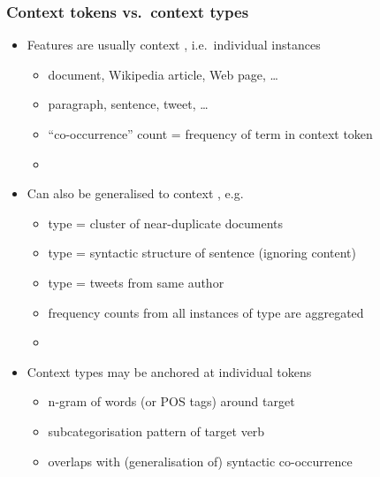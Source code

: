 \documentclass[t]{beamer} %
\begin{document}
\begin{frame}
  \frametitle{Context tokens vs.\ context types}

  \begin{itemize}
  \item Features are usually context , i.e.\ individual instances
    \begin{itemize}
    \item document, Wikipedia article, Web page, \ldots
    \item paragraph, sentence, tweet, \ldots
    \item ``co-occurrence'' count = frequency of term in context token
    \item[]
    \end{itemize}
  \item<2-> Can also be generalised to context , e.g.
    \begin{itemize}
    \item type = cluster of near-duplicate documents
    \item type = syntactic structure of sentence (ignoring content)
    \item type = tweets from same author
    \item frequency counts from all instances of type are aggregated
    \item[]
    \end{itemize}
  \item<3-> Context types may be anchored at individual tokens
    \begin{itemize}
    \item n-gram of words (or POS tags) around target
    \item subcategorisation pattern of target verb
    \item[\So] overlaps with (generalisation of) syntactic co-occurrence
    \end{itemize}
  \end{itemize}

\end{frame}

\end{document}

